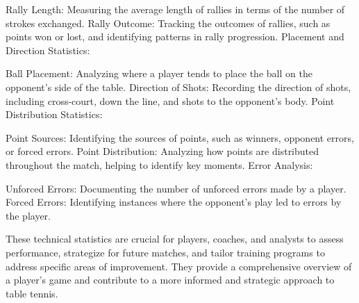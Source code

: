 \documentclass[12pt, a4paper, oneside]{article}
\theoremstyle{break}
\begin{document}
Rally Length: Measuring the average length of rallies in terms of the number of strokes exchanged.
Rally Outcome: Tracking the outcomes of rallies, such as points won or lost, and identifying patterns in rally progression.
Placement and Direction Statistics:

Ball Placement: Analyzing where a player tends to place the ball on the opponent's side of the table.
Direction of Shots: Recording the direction of shots, including cross-court, down the line, and shots to the opponent's body.
Point Distribution Statistics:

Point Sources: Identifying the sources of points, such as winners, opponent errors, or forced errors.
Point Distribution: Analyzing how points are distributed throughout the match, helping to identify key moments.
Error Analysis:

Unforced Errors: Documenting the number of unforced errors made by a player.
Forced Errors: Identifying instances where the opponent's play led to errors by the player.

These technical statistics are crucial for players, coaches, and analysts to assess performance, 
strategize for future matches, and tailor training programs to address specific areas of improvement. 
They provide a comprehensive overview of a player's game and contribute to a more informed and strategic 
approach to table tennis.\\
\end{document}
